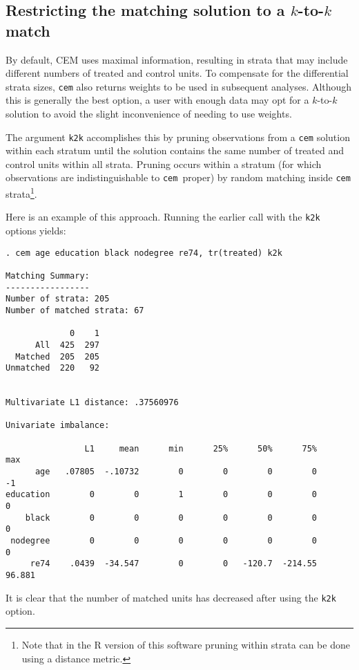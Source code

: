 \documentclass[11pt,titlepage]{article}
\newcommand{\cem}{\texttt{cem }}
\begin{document}
\subsection{Restricting the matching solution to a $k$-to-$k$ match}\label{s:k2k}

By default, CEM uses maximal information, resulting in strata that may
include different numbers of treated and control units.  To compensate for
the differential strata sizes, \texttt{cem} also returns weights to be
used in subsequent analyses.  Although this is generally the best option,
a user with enough data may opt for a $k$-to-$k$ solution to avoid the
slight inconvenience of needing to use weights.

The argument \texttt{k2k} accomplishes this by pruning observations from a
\texttt{cem} solution within each stratum until the solution contains the
same number of treated and control units within all strata.  Pruning
occurs within a stratum (for which observations are indistinguishable to
\cem proper) by random matching inside \texttt{cem} strata\footnote{Note
  that in the R version of this software pruning within strata can be done
  using a distance metric.}.

Here is an example of this approach. Running the earlier call with the
\texttt{k2k} options yields:

\begin{verbatim}
. cem age education black nodegree re74, tr(treated) k2k

Matching Summary:
-----------------
Number of strata: 205
Number of matched strata: 67

             0    1
      All  425  297
  Matched  205  205
Unmatched  220   92


Multivariate L1 distance: .37560976

Univariate imbalance:

                L1     mean      min      25%      50%      75%      max
      age   .07805  -.10732        0        0        0        0       -1
education        0        0        1        0        0        0        0
    black        0        0        0        0        0        0        0
 nodegree        0        0        0        0        0        0        0
     re74    .0439  -34.547        0        0   -120.7  -214.55   96.881

\end{verbatim}

It is clear that the number of matched units has decreased after using the
\texttt{k2k} option. 
\end{document}
